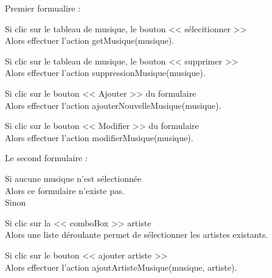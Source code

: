 \begin{paragraphe}
			\begin{paragraphe}
				Premier formualire :
			\end{paragraphe}

			\begin{paragraphe}
				Si clic sur le tableau de musique, le bouton << sélecitionner >> \\
				Alors effectuer l'action getMusique(musique).
			\end{paragraphe}

			\begin{paragraphe}
				Si clic sur le tableau de musique, le bouton << supprimer >> \\
				Alors effectuer l'action suppressionMusique(musique).
			\end{paragraphe}

			\begin{paragraphe}
				Si clic sur le bouton << Ajouter >> du formulaire \\
				Alors effectuer l'action ajouterNouvelleMusique(musique).
			\end{paragraphe}

			\begin{paragraphe}
				Si clic sur le bouton << Modifier >> du formulaire \\
				Alors effectuer l'action modifierMusique(musique).
			\end{paragraphe}

			\begin{paragraphe}
				Le second formulaire :
			\end{paragraphe}

			\begin{paragraphe}
				Si aucune musique n'est sélectionnée \\
				Alors ce formulaire n'existe pas. \\
				Sinon
			\end{paragraphe}

			\begin{paragraphe}
				Si clic sur la << comboBox >> artiste \\
				Alors une liste déroulante permet de sélectionner les artistes existants.
			\end{paragraphe}

			\begin{paragraphe}
				Si clic sur le bouton << ajouter artiste >> \\
				Alors effectuer l'action ajoutArtisteMusique(musique, artiste).
			\end{paragraphe}


\end{paragraphe}

